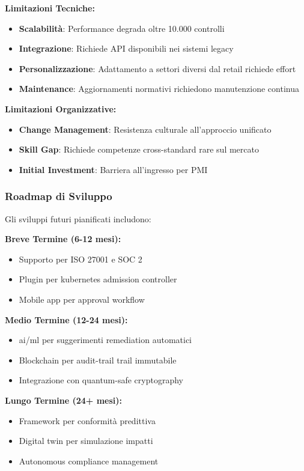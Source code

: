 \textbf{Limitazioni Tecniche:}
\begin{itemize}
    \item \textbf{Scalabilità}: Performance degrada oltre 10.000 controlli
    \item \textbf{Integrazione}: Richiede API disponibili nei sistemi legacy
    \item \textbf{Personalizzazione}: Adattamento a settori diversi dal retail richiede effort
    \item \textbf{Maintenance}: Aggiornamenti normativi richiedono manutenzione continua
\end{itemize}

\textbf{Limitazioni Organizzative:}
\begin{itemize}
    \item \textbf{Change Management}: Resistenza culturale all'approccio unificato
    \item \textbf{Skill Gap}: Richiede competenze cross-standard rare sul mercato
    \item \textbf{Initial Investment}: Barriera all'ingresso per PMI
\end{itemize}

\subsubsection{\texorpdfstring{Roadmap di Sviluppo}{4.7.4.2 - Roadmap di Sviluppo}}

Gli sviluppi futuri pianificati includono:

\textbf{Breve Termine (6-12 mesi):}
\begin{itemize}
    \item Supporto per ISO 27001 e SOC 2
    \item Plugin per \gls{kubernetes} admission controller
    \item Mobile app per approval workflow
\end{itemize}

\textbf{Medio Termine (12-24 mesi):}
\begin{itemize}
    \item \gls{ai}/\gls{ml} per suggerimenti remediation automatici
    \item Blockchain per \gls{audit-trail} trail immutabile
    \item Integrazione con quantum-safe cryptography
\end{itemize}

\textbf{Lungo Termine (24+ mesi):}
\begin{itemize}
    \item Framework per conformità predittiva
    \item Digital twin per simulazione impatti
    \item Autonomous \gls{compliance} management
\end{itemize}


